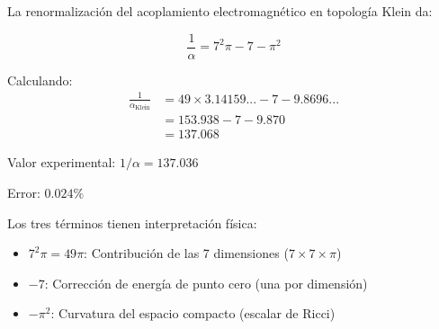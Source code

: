 \documentclass[12pt,a4paper,openany]{book}
\begin{document}
\begin{nivelmatematico}
La renormalización del acoplamiento electromagnético en topología Klein da:

\begin{equation}
    \frac{1}{\alpha} = 7^2\pi - 7 - \pi^2
\end{equation}

Calculando:
\begin{align}
    \frac{1}{\alpha_{\text{Klein}}} &= 49 \times 3.14159... - 7 - 9.8696... \\
    &= 153.938 - 7 - 9.870 \\
    &= 137.068
\end{align}

Valor experimental: $1/\alpha = 137.036$

Error: $0.024\%$

Los tres términos tienen interpretación física:
\begin{itemize}
    \item $7^2\pi = 49\pi$: Contribución de las 7 dimensiones ($7 \times 7 \times \pi$)
    \item $-7$: Corrección de energía de punto cero (una por dimensión)
    \item $-\pi^2$: Curvatura del espacio compacto (escalar de Ricci)
\end{itemize}

\end{nivelmatematico}
\end{document}
